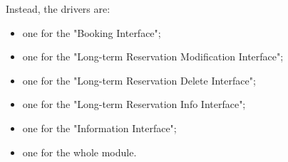 		Instead, the drivers are:
		\begin{itemize}
			\item one for the "Booking Interface";
			\item one for the "Long-term Reservation Modification Interface";
			\item one for the "Long-term Reservation Delete Interface";
			\item one for the "Long-term Reservation Info Interface";
			\item one for the "Information Interface";
			\item one for the whole module.
		\end{itemize}